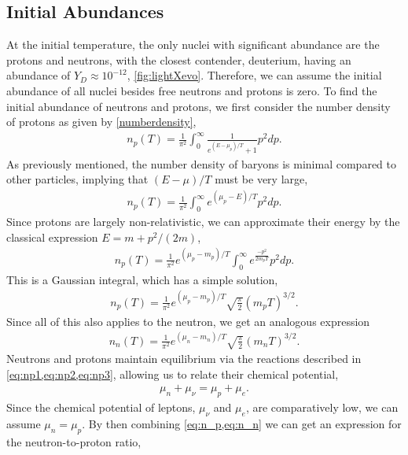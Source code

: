 \subsection{Initial Abundances}
\label{sec:iniabun}
At the initial temperature, the only nuclei with significant abundance are the protons and neutrons, with the closest contender, deuterium, having an abundance of $Y_D\approx 10^{-12}$, \cref{fig:lightXevo}. Therefore, we can assume the initial abundance of all nuclei besides free neutrons and protons is zero. To find the initial abundance of neutrons and protons, we first consider the number density of protons as given by \cref{numberdensity}, 
\begin{align}
    n_p(T)=\frac{1}{\pi^2}\int_{0}^{\infty}\frac{1}{e^{(E-\mu_p)/T}+1} p^2 dp.
\end{align}
As previously mentioned, the number density of baryons is minimal compared to other particles, implying that $(E-\mu)/T$ must be very large,
\begin{align}
    n_p(T)=\frac{1}{\pi^2}\int_{0}^{\infty}{e^{(\mu_p-E)/T}} p^2 dp.
\end{align}
Since protons are largely non-relativistic, we can approximate their energy by the classical expression $E=m+p^2/(2m)$, 
\begin{align}
    n_p(T)=\frac{1}{\pi^2}e^{(\mu_p-m_p)/T}\int_{0}^{\infty}{e^{\frac{-p^2}{2m_pT}}} p^2 dp.
\end{align}
This is a Gaussian integral, which has a simple solution\cite{griffiths_introduction_2018},
\begin{align}
    n_p(T)=\frac{1}{\pi^2} e^{(\mu_p-m_p)/T} \sqrt{\frac{\pi}{2}}\left( { m_p T} \right)^{3/2}.
    \label{eq:n_p}
\end{align}
Since all of this also applies to the neutron, we get an analogous expression
\begin{align}
    n_n(T)=\frac{1}{\pi^2} e^{(\mu_n-m_n)/T} \sqrt{\frac{\pi}{2}}\left( { m_n T} \right)^{3/2}.
    \label{eq:n_n}
\end{align}
Neutrons and protons maintain equilibrium via the reactions described in \cref{eq:np1,eq:np2,eq:np3}, allowing us to relate their chemical potential,
\begin{align}
    \mu_n+\mu_\nu=\mu_p+\mu_e.
\end{align}
Since the chemical potential of leptons, $\mu_\nu$ and $\mu_e$, are comparatively low\cite{kolbturner}, we can assume $\mu_n=\mu_p$. By then combining \cref{eq:n_p,eq:n_n} we can get an expression for the neutron-to-proton ratio,
